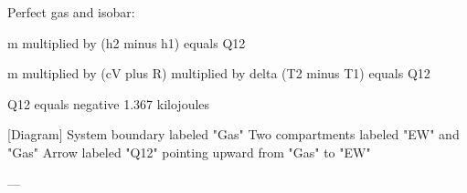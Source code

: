 Perfect gas and isobar:  

m multiplied by (h2 minus h1) equals Q12  

m multiplied by (cV plus R) multiplied by delta (T2 minus T1) equals Q12  

Q12 equals negative 1.367 kilojoules  

[Diagram]  
System boundary labeled "Gas"  
Two compartments labeled "EW" and "Gas"  
Arrow labeled "Q12" pointing upward from "Gas" to "EW"  

---